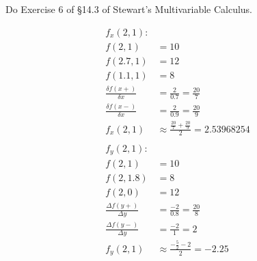 \documentclass[12pt]{exam}
\begin{document}
\begin{questions}
\begin{questions}
\end{questions}
\setcounter{question}{2}\clearpage
\question Do Exercise 6 of §14.3 of Stewart’s Multivariable Calculus.
	\begin{solution}
		\begin{align*}
			f_x(2, 1): \\
			f(2, 1) &= 10 \\
			f(2.7, 1) &= 12 \\
			f(1.1, 1) &= 8 \\
			\frac{\delta f(x+)}{\delta x} &= \frac{2}{0.7} = \frac{20}{7} \\
			\frac{\delta f(x-)}{\delta x} &= \frac{2}{0.9} = \frac{20}{9}  \\ 
			f_x(2, 1) &\approx \frac{\frac{20}{7} + \frac{20}{9}}{2} = \boxed{2.53968254} \\ \\ 
			f_y(2, 1): \\
			f(2, 1) &= 10 \\
			f(2, 1.8) &= 8 \\
			f(2, 0) &= 12 \\
			\frac{\Delta f(y+)}{\Delta y} &= \frac{-2}{0.8} = \frac{20}{8} \\
			\frac{\Delta f(y-)}{\Delta y} &= \frac{-2}{1} = 2 \\
			f_y(2, 1) &\approx \frac{-\frac{5}{2} - 2}{2} = \boxed{-2.25}
		\end{align*}
	\end{solution}\clearpage
\question 
	\begin{parts}

\end{parts}
\end{questions}
\end{document}
